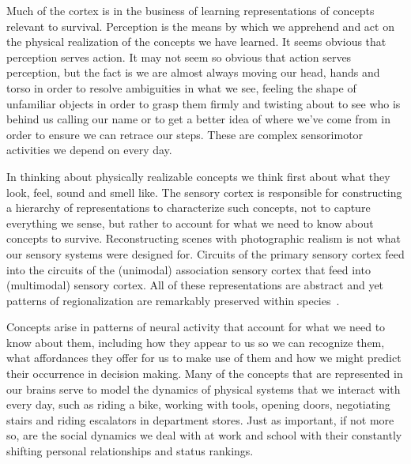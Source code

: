 \documentclass[letterpaper,11pt]{article}
\def\footnote#1{{}}
\begin{document}
Much of the cortex is in the business of learning representations of concepts relevant to survival\footnote{%
%
  The word {\it{perspicacity}} refers to a clarity of perception that enables one to recognize subtle differences between similar physical objects or abstract concepts. It is employed in this context to call attention to the fact that attention, exploration, perception, and prediction are inextricably linked in complex biological systems~\cite{RaoandBallardNATURE-NEUROSCIENCE-99,BarlowNC-89,BaddeleyQJoEP-86,ClarkBBS-13}.}.
%
Perception is the means by which we apprehend and act on the physical realization of the concepts we have learned. It seems obvious that perception serves action. It may not seem so obvious that action serves perception, but the fact is we are almost always moving our head, hands and torso in order to resolve ambiguities in what we see, feeling the shape of unfamiliar objects in order to grasp them firmly and twisting about to see who is behind us calling our name or to get a better idea of where we've come from in order to ensure we can retrace our steps. These are complex sensorimotor activities we depend on every day.

In thinking about physically realizable concepts we think first about what they look, feel, sound and smell like. The sensory cortex is responsible for constructing a hierarchy of representations to characterize such concepts, not to capture everything we sense, but rather to account for what we need to know about concepts to survive. Reconstructing scenes with photographic realism is not what our sensory systems were designed for. Circuits of the primary sensory cortex feed into the circuits of the (unimodal) association sensory cortex that feed into (multimodal) sensory cortex. All of these representations are abstract and yet patterns of regionalization are remarkably preserved within species~\cite{ChenetalNEURON-18,PortuguesetalNEURON-14,KolsteretalJoN-09}.

Concepts arise in patterns of neural activity that account for what we need to know about them, including how they appear to us so we can recognize them, what affordances they offer for us to make use of them and how we might predict their occurrence in decision making. Many of the concepts that are represented in our brains serve to model the dynamics of physical systems that we interact with every day, such as riding a bike, working with tools, opening doors, negotiating stairs and riding escalators in department stores. Just as important, if not more so, are the social dynamics we deal with at work and school with their constantly shifting personal relationships and status rankings. 
\end{document}
